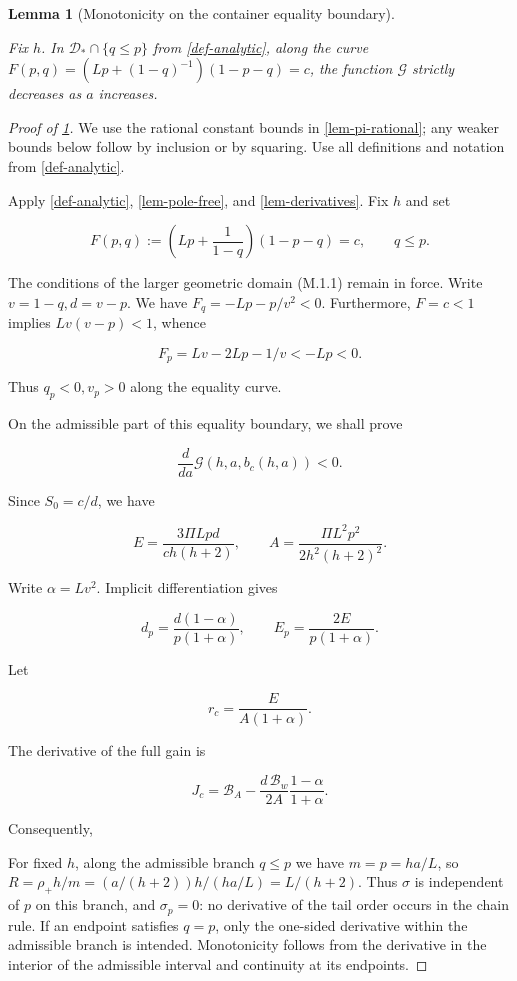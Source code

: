 \documentclass[11pt,a4paper]{article}
\theoremstyle{proofmanuscript}
\newtheorem{lemma}[theorem]{Lemma}
\begin{document}
\begin{lemma}[Monotonicity on the container equality boundary]\label{lem-container-monotone}

Fix \(h\). In \(\mathcal D_*\cap\{q\le p\}\) from \ref{def-analytic}, along the curve \(F(p,q)=(Lp+(1-q)^{-1})(1-p-q)=c\), the function \(\mathcal G\) strictly decreases as \(a\) increases.

\end{lemma}

\begin{proof}[Proof of \ref{lem-container-monotone}]

We use the rational constant bounds in \ref{lem-pi-rational}; any weaker bounds below follow by inclusion or by squaring. Use all definitions and notation from \ref{def-analytic}.

Apply \ref{def-analytic}, \ref{lem-pole-free}, and \ref{lem-derivatives}. Fix \(h\) and set

\[
F(p,q):=\left(Lp+\frac1{1-q}\right)(1-p-q)=c,\qquad q\le p.
                                                                  \tag{M.6.1}
\]

The conditions of the larger geometric domain (M.1.1) remain in force. Write \(v=1-q,d=v-p\). We have \(F_q=-Lp-p/v^2<0\). Furthermore, \(F=c<1\) implies \(Lv(v-p)<1\), whence

\[
F_p=Lv-2Lp-1/v<-Lp<0.
\]

Thus \(q_p<0,v_p>0\) along the equality curve.

On the admissible part of this equality boundary, we shall prove

\[
\frac d{da}\mathcal G(h,a,b_c(h,a))<0.                    \tag{M.6.2}
\]

Since \(S_0=c/d\), we have

\[
E=\frac{3\Pi Lpd}{ch(h+2)},\qquad
A=\frac{\Pi L^2p^2}{2h^2(h+2)^2}.
\]

Write \(\alpha=Lv^2\). Implicit differentiation gives

\[
d_p=\frac{d(1-\alpha)}{p(1+\alpha)},\qquad
E_p=\frac{2E}{p(1+\alpha)}.
\]

Let

\[
r_c=\frac{E}{A(1+\alpha)}.
\]

The derivative of the full gain is

\[
J_c=\mathcal B_A-\frac{d\,\mathcal B_w}{2A}
       \frac{1-\alpha}{1+\alpha}.
\]

Consequently,

For fixed \(h\), along the admissible branch \(q\le p\) we have \(m=p=ha/L\), so \(R=\rho_+h/m=(a/(h+2))h/(ha/L)=L/(h+2)\). Thus \(\sigma\) is independent of \(p\) on this branch, and \(\sigma_p=0\): no derivative of the tail order occurs in the chain rule. If an endpoint satisfies \(q=p\), only the one-sided derivative within the admissible branch is intended. Monotonicity follows from the derivative in the interior of the admissible interval and continuity at its endpoints.


\end{proof}
\end{document}
